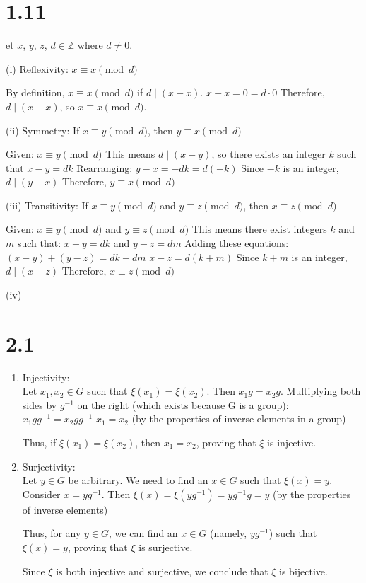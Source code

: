 \documentclass{article}
\begin{document}
\section{1.11}
\begin{solution}
    et $x$, $y$, $z$, $d \in \mathbb{Z}$ where $d \neq 0$.

(i) Reflexivity: $x \equiv x \pmod{d}$

By definition, $x \equiv x \pmod{d}$ if $d \mid (x - x)$.
$x - x = 0 = d \cdot 0$
Therefore, $d \mid (x - x)$, so $x \equiv x \pmod{d}$.

(ii) Symmetry: If $x \equiv y \pmod{d}$, then $y \equiv x \pmod{d}$

Given: $x \equiv y \pmod{d}$
This means $d \mid (x - y)$, so there exists an integer $k$ such that $x - y = dk$
Rearranging: $y - x = -dk = d(-k)$
Since $-k$ is an integer, $d \mid (y - x)$
Therefore, $y \equiv x \pmod{d}$

(iii) Transitivity: If $x \equiv y \pmod{d}$ and $y \equiv z \pmod{d}$, then $x \equiv z \pmod{d}$

Given: $x \equiv y \pmod{d}$ and $y \equiv z \pmod{d}$
This means there exist integers $k$ and $m$ such that:
$x - y = dk$ and $y - z = dm$
Adding these equations:
$(x - y) + (y - z) = dk + dm$
$x - z = d(k + m)$
Since $k + m$ is an integer, $d \mid (x - z)$
Therefore, $x \equiv z \pmod{d}$

(iv) 
\end{solution}

\section{2.1}
\begin{solution}
    \begin{enumerate}
        \item Injectivity: \\ Let $x_1, x_2 \in G$ such that $\xi(x_1) = \xi(x_2)$.
        Then $x_1g = x_2g$.
        Multiplying both sides by $g^{-1}$ on the right (which exists because G is a group):
        $x_1g g^{-1} = x_2g g^{-1}$
        $x_1 = x_2$ (by the properties of inverse elements in a group)
        
        Thus, if $\xi(x_1) = \xi(x_2)$, then $x_1 = x_2$, proving that $\xi$ is injective.
        \item Surjectivity: \\ Let $y \in G$ be arbitrary. We need to find an $x \in G$ such that $\xi(x) = y$.
        Consider $x = yg^{-1}$.
        Then $\xi(x) = \xi(yg^{-1}) = yg^{-1}g = y$ (by the properties of inverse elements)
        
        Thus, for any $y \in G$, we can find an $x \in G$ (namely, $yg^{-1}$) such that $\xi(x) = y$, proving that $\xi$ is surjective.
     
     Since $\xi$ is both injective and surjective, we conclude that $\xi$ is bijective.
    \end{enumerate}
\end{solution}
\end{document}
